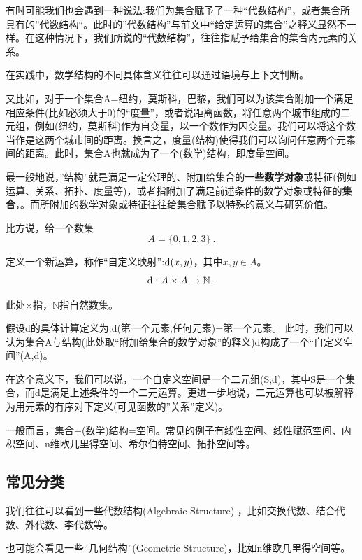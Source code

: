 有时可能我们也会遇到一种说法:我们为集合赋予了一种“代数结构”，或者集合所具有的”代数结构“。此时的”代数结构”与前文中“给定运算的集合”之释义显然不一样。在这种情况下，我们所说的“代数结构”，往往指赋予给集合的集合内元素的关系。

在实践中，数学结构的不同具体含义往往可以通过语境与上下文判断。

又比如，对于一个集合A={纽约，莫斯科，巴黎}，我们可以为该集合附加一个满足相应条件(比如必须大于0)的“度量”，或者说距离函数，将任意两个城市组成的二元组，例如(纽约，莫斯科)作为自变量，以一个数作为因变量。我们可以将这个数当作是这两个城市间的距离。换言之，度量(结构)使得我们可以询问任意两个元素间的距离。此时，集合A也就成为了一个(数学)结构，即度量空间。

最一般地说，”结构”就是满足一定公理的、附加给集合的\textbf{一些数学对象}或特征(例如运算、关系、拓扑、度量等)，或者指附加了满足前述条件的数学对象或特征的\textbf{集合}，。而所附加的数学对象或特征往往给集合赋予以特殊的意义与研究价值。

比方说，给一个数集
\begin{equation}
A = \{ 0,1,2,3 \}~.
\end{equation}

定义一个新运算，称作“自定义映射”:${\rm d}(x,y)$，其中$x,y\in A$。
\begin{equation}
{\rm d}:A \times A  \to {\mathbb N}~.
\end{equation}

此处$\times$指，${\mathbb N}$指自然数集。

假设d的具体计算定义为:d(第一个元素,任何元素)=第一个元素。
此时，我们可以认为集合A与结构(此处取“附加给集合的数学对象”的释义)d构成了一个“自定义空间”(A,d)。

在这个意义下，我们可以说，一个自定义空间是一个二元组(S,d)，其中S是一个集合，而d是满足上述条件的一个二元运算。更进一步地说，二元运算也可以被解释为用元素的有序对下定义(可见函数的”关系”定义)。

一般而言，集合+(数学)结构=空间。常见的例子有\href{https://wuli.wiki/online/LSpace.html}{线性空间}、线性赋范空间、内积空间、n维欧几里得空间、希尔伯特空间、拓扑空间等。

\subsection{常见分类}
我们往往可以看到一些代数结构(Algebraic Structure) ，比如交换代数、结合代数、外代数、李代数等。

也可能会看见一些“几何结构”(Geometric Structure)，比如n维欧几里得空间等。

